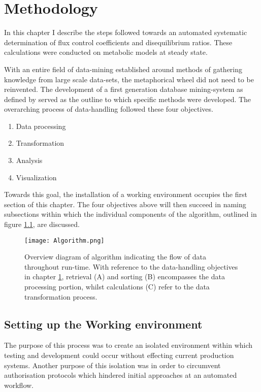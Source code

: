 \chapter{Methodology} \label{chp:3}
In this chapter I describe the steps followed towards an automated systematic determination of flux control coefficients and disequilibrium ratios. These calculations were conducted on metabolic models at steady state. 

With an entire field of data-mining established around methods of gathering knowledge from large scale data-sets, the metaphorical wheel did not need to be reinvented. The development of a first generation database mining-system as defined by \citeauthor{Imielinski1996, Radivojac2004, Uppalaiah2012} served as the outline to which specific methods were developed. The overarching process of data-handling followed these four objectives.

\begin{enumerate}
\item Data processing
\item Transformation
\item Analysis
\item Visualization
\end{enumerate} 

Towards this goal, the installation of a working environment occupies the first section of this chapter. The four objectives above will then succeed in naming subsections within which the individual components of the algorithm, outlined in figure \ref{Algorithm}, are discussed. 

\begin{figure}[h] 
\texttt{[image: Algorithm.png]}
\centering
\caption{Overview diagram of algorithm indicating the flow of data throughout run-time. With reference to the data-handling objectives in chapter \ref{chp:3}, retrieval (A) and sorting (B) encompasses the data processing portion, whilst calculations (C) refer to the data transformation process.}
\label{Algorithm}
\end{figure}

\section{Setting up the Working environment} \label{Working Environment}
The purpose of this process was to create an isolated environment within which testing and development could occur without effecting current production systems. Another purpose of this isolation was in order to circumvent authorisation protocols which hindered initial approaches at an automated workflow. 

